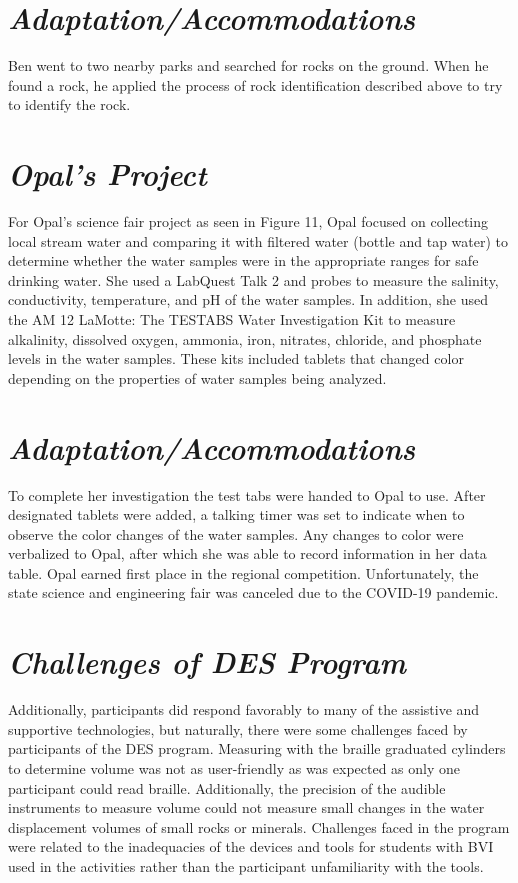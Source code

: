 \documentclass[11pt]{sig-alternate}
\begin{document}
\begin{large}
\section*{\textit{Adaptation/Accommodations}}
 Ben went to two nearby parks and searched for rocks on the ground. When he found a rock, he applied the process of rock identification described above to try to identify the rock.
\section*{\textit{Opal’s Project}} 
For Opal’s science fair project as seen in Figure 11, Opal focused on collecting local stream water and comparing it with filtered water (bottle and tap water) to determine whether the water samples were in the appropriate ranges for safe drinking water. She used a LabQuest Talk 2  and probes to measure the salinity, conductivity, temperature, and pH of the water samples.  In addition, she used the AM 12 LaMotte: The TESTABS Water Investigation Kit to measure alkalinity, dissolved oxygen, ammonia, iron, nitrates, chloride, and phosphate levels in the water samples. These kits included tablets that changed color depending on the properties of water samples being analyzed.  
\section*{\textit{Adaptation/Accommodations}} 
To complete her investigation the test tabs were handed to Opal to use. After designated tablets were added, a talking timer was set to indicate when to observe the color changes of the water samples.  Any changes to color were verbalized to Opal, after which she was able to record information in her data table. Opal earned first place in the regional competition. Unfortunately, the state science and engineering fair was canceled due to the COVID-19 pandemic.
\section*{\textit{Challenges of DES Program}}
Additionally, participants did respond favorably to many of the assistive and supportive technologies, but naturally, there were some challenges faced by participants of the DES program. Measuring with the braille graduated cylinders to determine volume was not as user-friendly as was expected as only one participant could read braille. Additionally, the precision of the audible instruments to measure volume could not measure small changes in the water displacement volumes of small rocks or minerals. Challenges faced in the program were related to the inadequacies of the devices and tools for students with BVI used in the activities rather than the participant unfamiliarity with the tools.


\end{large}
\end{document}

